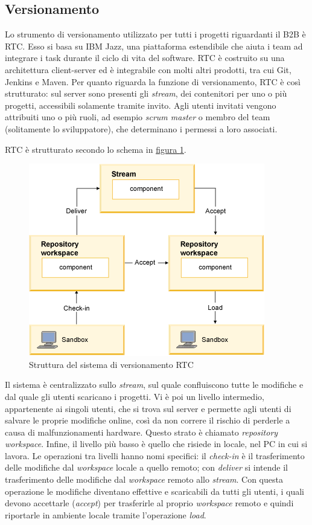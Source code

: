 \subsection{Versionamento}
Lo strumento di versionamento utilizzato per tutti i progetti riguardanti il B2B è \Gls{RTC}. Esso si basa su IBM Jazz, una piattaforma estendibile che aiuta i team ad integrare i task durante il ciclo di vita del software. RTC è costruito su una architettura client-server ed è integrabile con molti altri prodotti, tra cui \gls{Git}, \Gls{Jenkins} e \Gls{Maven}. Per quanto riguarda la funzione di versionamento, RTC è così strutturato: sul server sono presenti gli \textit{stream}, dei contenitori per uno o più progetti, accessibili solamente tramite invito. Agli utenti invitati vengono attribuiti uno o più ruoli, ad esempio \textit{scrum master} o membro del team (solitamente lo sviluppatore), che determinano i permessi a loro associati. 

RTC è strutturato secondo lo schema in \hyperref[fig:rtc-struttura]{figura \ref{fig:rtc-struttura}}.
\begin{figure}[H]
	\centering
	\includegraphics{Immagini/rtc-struttura.png}
	\caption{Struttura del sistema di versionamento RTC}
	\label{fig:rtc-struttura}
\end{figure}
Il sistema è centralizzato sullo \textit{stream}, sul quale confluiscono tutte le modifiche e dal quale gli utenti scaricano i progetti. Vi è poi un livello intermedio, appartenente ai singoli utenti, che si trova sul server e permette agli utenti di salvare le proprie modifiche online, così da non correre il rischio di perderle a causa di malfunzionamenti hardware. Questo strato è chiamato \textit{repository workspace}. Infine, il livello più basso è quello che risiede in locale, nel PC in cui si lavora. Le operazioni tra livelli hanno nomi specifici: il \textit{check-in} è il trasferimento delle modifiche dal \textit{workspace} locale a quello remoto; con \textit{deliver} si intende il trasferimento delle modifiche dal \textit{workspace} remoto allo \textit{stream}. Con questa operazione le modifiche diventano effettive e scaricabili da tutti gli utenti, i quali devono accettarle (\textit{accept}) per trasferirle al proprio \textit{workspace} remoto e quindi riportarle in ambiente locale tramite l'operazione \textit{load}.


